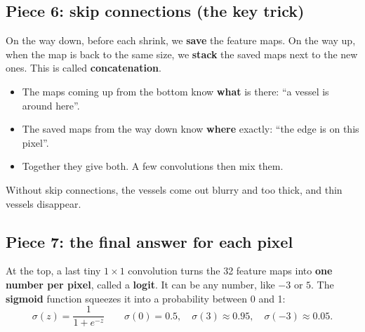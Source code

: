 \documentclass[11pt,a4paper]{article}
\begin{document}
\subsection{Piece 6: skip connections (the key trick)}
On the way down, before each shrink, we \textbf{save} the feature maps. On the way up, when the map is back to the same size, we \textbf{stack} the saved maps next to the new ones. This is called \textbf{concatenation}.
\begin{itemize}
  \item The maps coming up from the bottom know \textbf{what} is there: ``a vessel is around here''.
  \item The saved maps from the way down know \textbf{where} exactly: ``the edge is on this pixel''.
  \item Together they give both. A few convolutions then mix them.
\end{itemize}
Without skip connections, the vessels come out blurry and too thick, and thin vessels disappear.

\subsection{Piece 7: the final answer for each pixel}
At the top, a last tiny $1\times1$ convolution turns the 32 feature maps into \textbf{one number per pixel}, called a \textbf{logit}. It can be any number, like $-3$ or $5$. The \textbf{sigmoid} function squeezes it into a probability between 0 and 1:
\[
\sigma(z) = \frac{1}{1 + e^{-z}} \qquad
\sigma(0) = 0.5,\quad \sigma(3) \approx 0.95,\quad \sigma(-3) \approx 0.05.
\]
\end{document}
